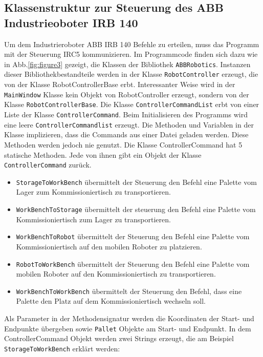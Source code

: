 \subsection{Klassenstruktur zur Steuerung des ABB Industrieoboter IRB 140}\label{ABBKlassen}
Um dem Industrieroboter ABB IRB 140 Befehle zu erteilen, muss das Programm mit der Steuerung IRC5 kommunizieren.
Im Programmcode finden sich dazu wie in Abb.\ref{fig:figure3} gezeigt, die Klassen der Bibliothek \verb|ABBRobotics|.
Instanzen dieser Bibliothekbestandteile werden in der Klasse \verb|RobotController| erzeugt, die von der Klasse
RobotControllerBase erbt.
Interessanter Weise wird in der \verb|MainWindow| Klasse kein Objekt von RobotController erzeugt, sondern von der Klasse
\verb|RobotControllerBase|.
Die Klasse \verb|ControllerCommandList| erbt von einer Liste der Klasse \verb|ControllerCommand|.
Beim Initialisieren des Programms wird eine leere \verb|ControllerCommandlist| erzeugt.
Die Methoden und Variablen in der Klasse implizieren, dass die Commands aus einer Datei geladen werden.
Diese Methoden werden jedoch nie genutzt.
Die Klasse ControllerCommand hat 5 statische Methoden.
Jede von ihnen gibt ein Objekt der Klasse \verb|ControllerCommand| zurück.
\begin{itemize}
    \item \verb|StorageToWorkBench| übermittelt der Steuerung den Befehl eine Palette vom Lager zum Kommissioniertisch
    zu transportieren.
    \item \verb|WorkBenchToStorage| übermittelt der steuerung den Befehl eine Palette vom Kommissioniertisch zum Lager
    zu transportieren.
    \item \verb|WorkBenchToRobot| übermittelt der Steuerung den Befehl eine Palette vom Kommissioniertisch auf den
    mobilen Roboter zu platzieren.
    \item \verb|RobotToWorkBench| übermittelt der Steuerung den Befehl eine Palette vom mobilen Roboter auf den
    Kommissioniertisch zu transportieren.
    \item \verb|WorkBenchToWorkBench| übermittelt der Steuerung den Befehl, dass eine Palette den Platz auf dem
    Kommissioniertisch wechseln soll.

\end{itemize}
Als Parameter in der Methodensignatur werden die Koordinaten der Start- und Endpunkte übergeben
sowie \verb|Pallet| Objekte am Start- und Endpunkt.
In dem ControllerCommand Objekt werden zwei Strings erzeugt, die am Beispiel \verb|StorageToWorkBench| erklärt werden:
\newline
